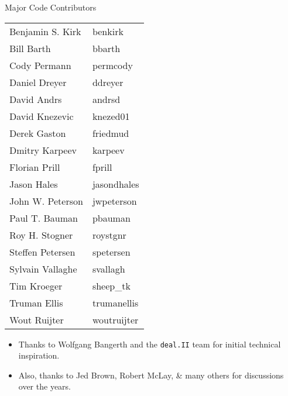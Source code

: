 \begin{frame}[shrink]
  \begin{block}{Major Code Contributors}
    \scriptsize
    \begin{center}
      \begin{tabular}{|l|l|} \hline
        Benjamin S. Kirk & benkirk \\
        Bill Barth       & bbarth \\
        Cody Permann     & permcody \\
        Daniel Dreyer    & ddreyer \\
        David Andrs      & andrsd \\
        David Knezevic   & knezed01 \\
        Derek Gaston     & friedmud \\
        Dmitry Karpeev   & karpeev \\
        Florian Prill    & fprill \\
        Jason Hales      & jasondhales \\
        John W. Peterson & jwpeterson \\
        Paul T. Bauman   & pbauman \\
        Roy H. Stogner   & roystgnr \\
        Steffen Petersen & spetersen \\
        Sylvain Vallaghe & svallagh \\
        Tim Kroeger      & sheep\_tk \\
        Truman Ellis     & trumanellis \\
        Wout Ruijter     & woutruijter \\ \hline
      \end{tabular}
    \end{center}
    \begin{itemize}
      \item Thanks to Wolfgang Bangerth and the \texttt{deal.II} team for initial technical inspiration.
      \item Also, thanks to Jed Brown, Robert McLay, \& many others for discussions over the years.
    \end{itemize}
  \end{block}
\end{frame}
